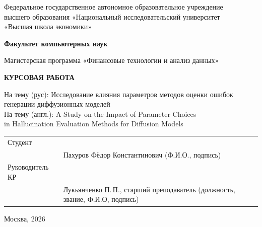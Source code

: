 \begin{titlepage}
\begin{center}
Федеральное государственное автономное образовательное учреждение\\
высшего образования «Национальный исследовательский университет\\
«Высшая школа экономики»

\bigskip
\textbf{Факультет компьютерных наук}

\smallskip
Магистерская программа «Финансовые технологии и анализ данных»
\end{center}

\vspace{6em}

\begin{center}
{\bf\large КУРСОВАЯ РАБОТА}
\end{center}

\vspace{1.5em}

\noindent На тему (рус): Исследование влияния параметров методов оценки ошибок\\
генерации диффузионных моделей\\[1.2ex]
\noindent На тему (англ.): A Study on the Impact of Parameter Choices\\
in Hallucination Evaluation Methods for Diffusion Models

\vspace{6em}

\noindent\begin{tabular}{@{}ll@{}}
Студент & \underline{\hspace{6cm}}\\
        & \footnotesize Пахуров Фёдор Константинович (Ф.И.О., подпись)\\[2ex]
Руководитель КР & \underline{\hspace{6cm}}\\
        & \footnotesize Лукьянченко П.\,П., старший преподаватель (должность, звание, Ф.И.О, подпись)\\
\end{tabular}

\vfill
\begin{center}
Москва, 2026
\end{center}
\end{titlepage}
